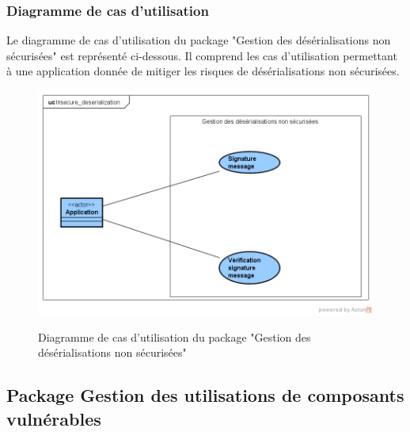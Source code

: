 \subsubsection{Diagramme de cas d'utilisation}
Le diagramme de cas d'utilisation du package "Gestion des désérialisations non sécurisées" est représenté ci-dessous. Il comprend les cas d'utilisation permettant à une application donnée de mitiger les risques de désérialisations non sécurisées.\\ 
\begin{figure}[H]
	\centering
	\begin{minipage}{12cm}
		\centering
		{\includegraphics[height=0.30\textheight]{fig/Insecure_deserialization-use-case-diagram.png}}
	\end{minipage}
	\caption{Diagramme de cas d'utilisation du package "Gestion des désérialisations non sécurisées"}
	\label{fig:7.9}
\end{figure}

\subsection{Package Gestion des utilisations de composants vulnérables}
